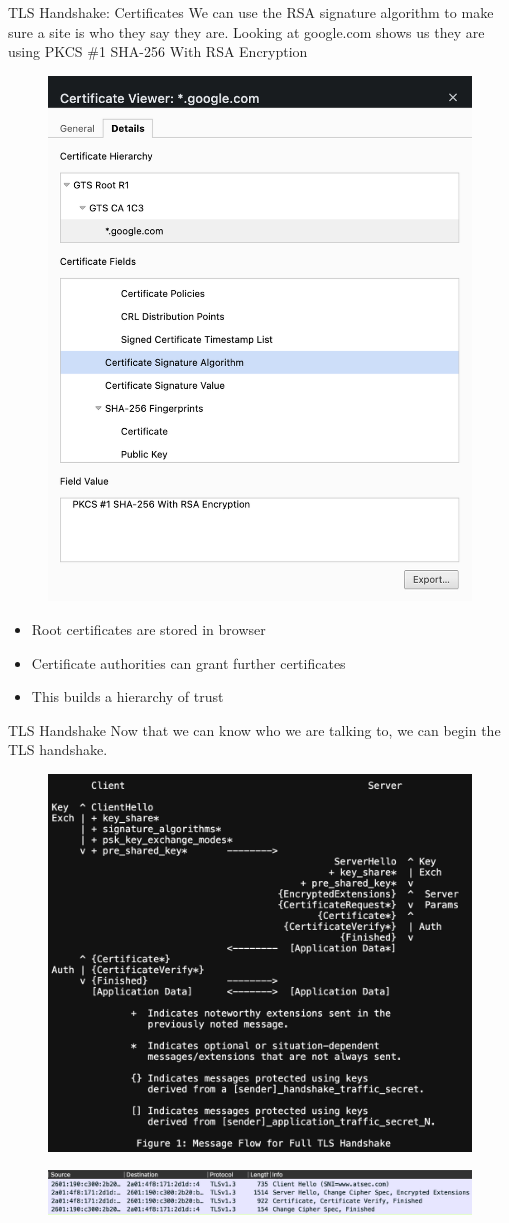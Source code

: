 \documentclass{beamer}
\begin{document}
\begin{frame}{TLS Handshake: Certificates}
    We can use the RSA signature algorithm to make sure a site is who they say they are. Looking at google.com shows us they are using PKCS \#1 SHA-256 With RSA Encryption
    \begin{figure}
        \centering
        \includegraphics[width=0.35\linewidth]{figures/google certificate.png}
    \end{figure}
    \begin{itemize}
        \item Root certificates are stored in browser
        \item Certificate authorities can grant further certificates
        \item This builds a hierarchy of trust
    \end{itemize}
\end{frame}

\begin{frame}{TLS Handshake}
    Now that we can know who we are talking to, we can begin the TLS handshake.
    \begin{figure}
        \centering
        \includegraphics[width=.5\textwidth]{figures/handshake.png}
    \end{figure}
    \begin{figure}
        \centering
        \includegraphics[width=.6\textwidth]{figures/real_hs.png}
    \end{figure}
\end{frame}
\end{document}
